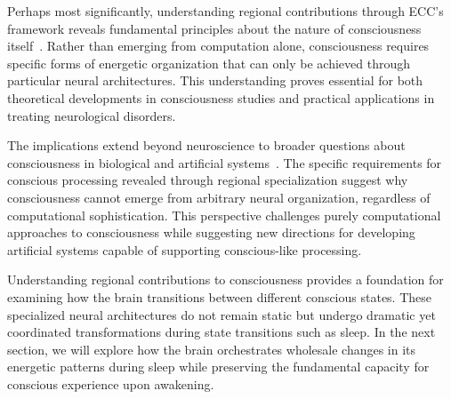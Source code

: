 Perhaps most significantly, understanding regional contributions through ECC's framework reveals fundamental principles about the nature of consciousness itself~\cite{da2024mathematical}. Rather than emerging from computation alone, consciousness requires specific forms of energetic organization that can only be achieved through particular neural architectures. This understanding proves essential for both theoretical developments in consciousness studies and practical applications in treating neurological disorders.

The implications extend beyond neuroscience to broader questions about consciousness in biological and artificial systems~\cite{Tononi2016}. The specific requirements for conscious processing revealed through regional specialization suggest why consciousness cannot emerge from arbitrary neural organization, regardless of computational sophistication. This perspective challenges purely computational approaches to consciousness while suggesting new directions for developing artificial systems capable of supporting conscious-like processing.

Understanding regional contributions to consciousness provides a foundation for examining how the brain transitions between different conscious states. These specialized neural architectures do not remain static but undergo dramatic yet coordinated transformations during state transitions such as sleep. In the next section, we will explore how the brain orchestrates wholesale changes in its energetic patterns during sleep while preserving the fundamental capacity for conscious experience upon awakening.
